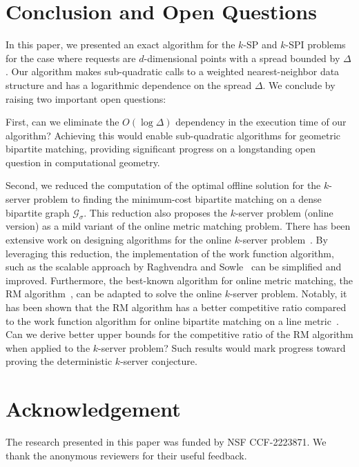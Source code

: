 \documentclass[11pt,onecolumn]{article}
\newcommand{\requests}{\sigma}
\begin{document}
\section{Conclusion and Open Questions}\label{sec:conclusion}
In this paper, we presented an exact algorithm for the $k$-SP and $k$-SPI problems for the case where requests are $d$-dimensional points with a spread bounded by $\Delta$. Our algorithm makes sub-quadratic calls to a weighted nearest-neighbor data structure and has a logarithmic dependence on the spread $\Delta$.  We conclude by raising two important open questions:

First, can we eliminate the $O(\log \Delta)$ dependency in the execution time of our algorithm? Achieving this would enable sub-quadratic algorithms for geometric bipartite matching, providing significant progress on a longstanding open question in computational geometry. 

Second, we reduced the computation of the optimal offline solution for the $k$-server problem to finding the minimum-cost bipartite matching on a dense bipartite graph $\mathcal{G}_\requests$. This reduction also proposes the $k$-server problem (online version) as a mild variant of the online metric matching problem. There has been extensive work on designing algorithms for the online $k$-server problem~\cite{bubeck2018k,S7,S16,S3, jamesLee2018, S14, raghvendra2022scalable, rudec2013fast}. By leveraging this reduction, the implementation of the work function algorithm, such as the scalable approach by Raghvendra and Sowle~\cite{raghvendra2022scalable} can be simplified and improved. Furthermore, the best-known algorithm for online metric matching, the RM algorithm~\cite{my_focs_paper, raghvendra2016robust}, can be adapted to solve the online $k$-server problem. Notably, it has been shown that the RM algorithm has a better competitive ratio compared to the work function algorithm for online bipartite matching on a line metric~\cite{s_socg18}. Can we derive better upper bounds for the competitive ratio of the RM algorithm when applied to the $k$-server problem? Such results would mark progress toward proving the deterministic $k$-server conjecture. 

\section*{Acknowledgement}
The research presented in this paper was funded by NSF CCF-2223871. We thank the anonymous reviewers for their useful feedback.
\end{document}
